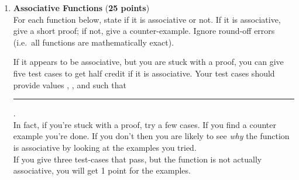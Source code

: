 \documentclass{article}
\begin{document}
\begin{enumerate}
  \begin{figure}\begin{center}
    \begin{xcode}
      reduce(\tuple{\_}, [], \_, GrandTotal) -> GrandTotal;\\
      reduce(ParentPid, [], \_, MyTotal) ->\\
      ParentPid ! ,\\
      receive\\
      \> -> GrandTotal\\
      end;\\
      reduce(Parent, [ChildHd | ChildTl], CombineFun, LeftTotal) ->\\
      \>receive\\
      \>\> ->\\
      \>\>\>GrandTotal =\\
      \>\>\>\>reduce(Parent, ChildTl, CombineFun, CombineFun(LeftTotal, RightTotal)),\\
      \>\>\>ChildHd ! ,\\
      \>\>\>GrandTotal\\
      \>end.\\
      \rule{0em}{3ex}%
      stats(\_C0, 0, Acc) -> Acc;\\
      stats(C0, N, Acc) ->\\
      \>stats(C0, N-1, stat:accum(island:sim(C0), Acc)).\\
    \end{xcode}
    \caption{Functions  and .}\label{fig:hw2-fun}
  \end{center}\end{figure}

	
  \item \textbf{Associative Functions} (\textbf{25 points})\label{q:assoc}\\
    For each function below, state if it is associative or not.
    If it is associative, give a short proof; if not, give a counter-example.
    Ignore round-off errors (i.e.\ all functions are mathematically exact).

    If it appears to be associative, but you are stuck with a proof, you
    can give five test cases to get half credit if it is associative.
    Your test cases should provide values , , and 
    such that\\
    \rule{1.5em}{0ex}.\\
    In fact, if you're stuck with a proof, try a few cases.  If you find a counter
    example you're done.  If you don't then you are likely to see \emph{why} the
    function is associative by looking at the examples you tried.\\
    If you give three test-cases that pass, but the function is not actually
    associative, you will get 1 point for the examples.


\end{enumerate}
\end{document}
